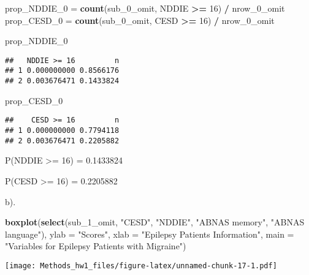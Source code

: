 \documentclass[]{article}
\newenvironment{Shaded}{\begin{snugshade}}{\end{snugshade}}
\newcommand{\KeywordTok}[1]{\textcolor[rgb]{0.13,0.29,0.53}{\textbf{#1}}}
\newcommand{\DataTypeTok}[1]{\textcolor[rgb]{0.13,0.29,0.53}{#1}}
\newcommand{\DecValTok}[1]{\textcolor[rgb]{0.00,0.00,0.81}{#1}}
\newcommand{\StringTok}[1]{\textcolor[rgb]{0.31,0.60,0.02}{#1}}
\newcommand{\OperatorTok}[1]{\textcolor[rgb]{0.81,0.36,0.00}{\textbf{#1}}}
\newcommand{\NormalTok}[1]{#1}
\begin{document}
\begin{Shaded}
\begin{Highlighting}[]
\NormalTok{prop_NDDIE_}\DecValTok{0}\NormalTok{ =}\StringTok{ }\KeywordTok{count}\NormalTok{(sub_0_omit, NDDIE }\OperatorTok{>=}\StringTok{ }\DecValTok{16}\NormalTok{) }\OperatorTok{/}\StringTok{ }\NormalTok{nrow_0_omit}
\NormalTok{prop_CESD_}\DecValTok{0}\NormalTok{ =}\StringTok{ }\KeywordTok{count}\NormalTok{(sub_0_omit, CESD }\OperatorTok{>=}\StringTok{ }\DecValTok{16}\NormalTok{) }\OperatorTok{/}\StringTok{ }\NormalTok{nrow_0_omit}

\NormalTok{prop_NDDIE_}\DecValTok{0}
\end{Highlighting}
\end{Shaded}

\begin{verbatim}
##   NDDIE >= 16         n
## 1 0.000000000 0.8566176
## 2 0.003676471 0.1433824
\end{verbatim}

\begin{Shaded}
\begin{Highlighting}[]
\NormalTok{prop_CESD_}\DecValTok{0}
\end{Highlighting}
\end{Shaded}

\begin{verbatim}
##    CESD >= 16         n
## 1 0.000000000 0.7794118
## 2 0.003676471 0.2205882
\end{verbatim}

P(NDDIE \textgreater{}= 16) = 0.1433824

P(CESD \textgreater{}= 16) = 0.2205882

b).

\begin{Shaded}
\begin{Highlighting}[]
\KeywordTok{boxplot}\NormalTok{(}\KeywordTok{select}\NormalTok{(sub_1_omit, }\StringTok{"CESD"}\NormalTok{, }\StringTok{"NDDIE"}\NormalTok{, }\StringTok{"ABNAS memory"}\NormalTok{, }\StringTok{"ABNAS language"}\NormalTok{), }\DataTypeTok{ylab =} \StringTok{"Scores"}\NormalTok{, }\DataTypeTok{xlab =} \StringTok{"Epilepsy Patients Information"}\NormalTok{, }\DataTypeTok{main =} \StringTok{"Variables for Epilepsy Patients with Migraine"}\NormalTok{)}
\end{Highlighting}
\end{Shaded}

\texttt{[image: Methods\_hw1\_files/figure-latex/unnamed-chunk-17-1.pdf]}
\end{document}
